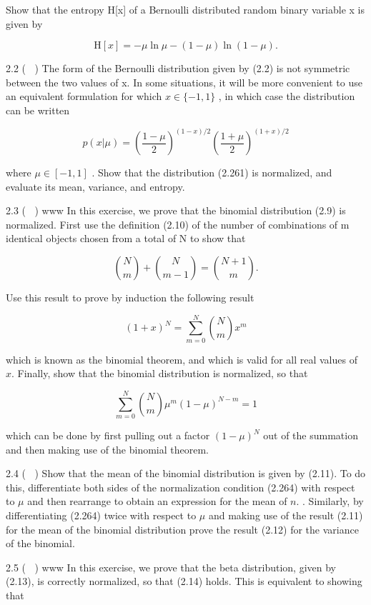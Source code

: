 \documentclass[
  10
]{article}
\begin{document}
Show that the entropy H{[}x{]} of a Bernoulli distributed random binary
variable x is given by

\[
\mathrm{H} [ x ] = - \mu \ln \mu - (1 - \mu) \ln (1 - \mu).\tag{2.260}
\]

2.2 ( ) The form of the Bernoulli distribution given by (2.2) is not
symmetric between the two values of x. In some situations, it will be
more convenient to use an equivalent formulation for which
\(x \in \{ - 1 , 1 \}\) , in which case the distribution can be written

\[
p (x | \mu) = \left(\frac {1 - \mu}{2}\right) ^ {(1 - x) / 2} \left(\frac {1 + \mu}{2}\right) ^ {(1 + x) / 2}\tag{2.261}
\]

where \(\mu \in [ - 1 , 1 ]\) . Show that the distribution (2.261) is
normalized, and evaluate its mean, variance, and entropy.

2.3 ( ) www In this exercise, we prove that the binomial distribution
(2.9) is normalized. First use the definition (2.10) of the number of
combinations of m identical objects chosen from a total of N to show
that

\[
\binom {N} {m} + \binom {N} {m - 1} = \binom {N + 1} {m}.\tag{2.262}
\]

Use this result to prove by induction the following result

\[
(1 + x) ^ {N} = \sum_ {m = 0} ^ {N} {\binom {N} {m}} x ^ {m}\tag{2.263}
\]

which is known as the binomial theorem, and which is valid for all real
values of \(x .\) Finally, show that the binomial distribution is
normalized, so that

\[
\sum_ {m = 0} ^ {N} \binom {N} {m} \mu^ {m} (1 - \mu) ^ {N - m} = 1\tag{2.264}
\]

which can be done by first pulling out a factor \(( 1 - \mu ) ^ { N }\)
out of the summation and then making use of the binomial theorem.

2.4 ( ) Show that the mean of the binomial distribution is given by
(2.11). To do this, differentiate both sides of the normalization
condition (2.264) with respect to \(\mu\) and then rearrange to obtain
an expression for the mean of \(n .\) . Similarly, by differentiating
(2.264) twice with respect to \(\mu\) and making use of the result
(2.11) for the mean of the binomial distribution prove the result (2.12)
for the variance of the binomial.

2.5 ( ) www In this exercise, we prove that the beta distribution, given
by (2.13), is correctly normalized, so that (2.14) holds. This is
equivalent to showing that
\end{document}
